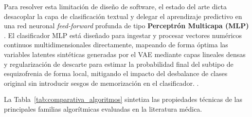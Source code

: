 \documentclass[12pt,a4paper,onecolumn,oneside]{report}
\begin{document}
Para resolver esta limitación de diseño de software, el estado del arte dicta desacoplar la capa de clasificación textual y delegar el aprendizaje predictivo en una red neuronal \textit{feed-forward} profunda de tipo \textbf{Perceptrón Multicapa (MLP)} \cite{saboori2025predictive, jimenez2023xai}. El clasificador MLP está diseñado para ingestar y procesar vectores numéricos continuos multidimensionales directamente, mapeando de forma óptima las variables latentes sintéticas generadas por el VAE mediante capas lineales densas y regularización de descarte para estimar la probabilidad final del subtipo de esquizofrenia de forma local, mitigando el impacto del desbalance de clases original sin introducir sesgos de memorización en el clasificador. \cite{saboori2025predictive, jimenez2023xai}.

La Tabla~\ref{tab:comparativa_algoritmos} sintetiza las propiedades técnicas de las principales familias algorítmicas evaluadas en la literatura médica.
\end{document}
